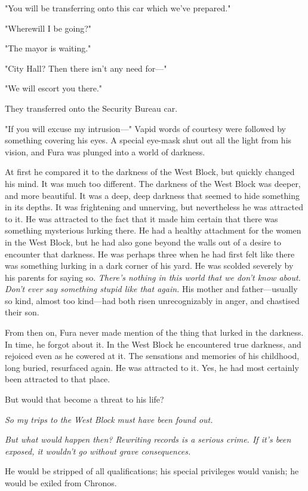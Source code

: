 "You will be transferring onto this car which we've prepared."

"Where\el will I be going?"

"The mayor is waiting."

"City Hall? Then there isn't any need for---"

"We will escort you there."

They transferred onto the Security Bureau car.

"If you will excuse my intrusion---" Vapid words of courtesy were followed
by something covering his eyes. A special eye-mask shut out all the
light from his vision, and Fura was plunged into a world of darkness.

At first he compared it to the darkness of the West Block, but quickly
changed his mind. It was much too different. The darkness of the West
Block was deeper, and more beautiful. It was a deep, deep darkness that
seemed to hide something in its depths. It was frightening and
unnerving, but nevertheless he was attracted to it. He was attracted to
the fact that it made him certain that there was something mysterious
lurking there. He had a healthy attachment for the women in the West
Block, but he had also gone beyond the walls out of a desire to
encounter that darkness. He was perhaps three when he had first felt
like there was something lurking in a dark corner of his yard. He was
scolded severely by his parents for saying so. \emph{There's nothing in this
world that we don't know about. Don't ever say something stupid like
that again.} His mother and father---usually so kind, almost too kind---had
both risen unrecognizably in anger, and chastised their son.

From then on, Fura never made mention of the thing that lurked in the
darkness. In time, he forgot about it. In the West Block he encountered
true darkness, and rejoiced even as he cowered at it. The sensations and
memories of his childhood, long buried, resurfaced again. He was
attracted to it. Yes, he had most certainly been attracted to that
place.

But would that become a threat to his life?

\emph{So my trips to the West Block must have been found out.}

\emph{But what would happen then? Rewriting records is a serious crime. If
it's been exposed, it wouldn't go without grave consequences.}

He would be stripped of all qualifications; his special privileges would
vanish; he would be exiled from Chronos.

